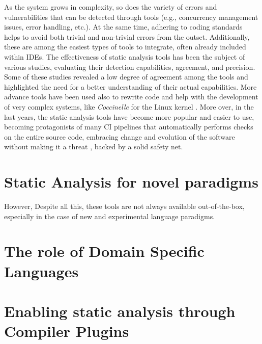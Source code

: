 \documentclass[12pt,a4paper,openright,twoside]{book}
\begin{document}
As the system grows in complexity, so does the variety of errors and
vulnerabilities that can be detected through tools (e.g., concurrency management
issues, error handling, etc.). At the same time, adhering to coding standards
helps to avoid both trivial and non-trivial errors from the outset.
Additionally, these are among the easiest types of tools to integrate, often
already included within \acp{IDE}.
%
The effectiveness of static analysis tools has been the subject of various
studies,  \cite{DBLP:journals/jss/LenarduzziPSLP23} evaluating their detection
capabilities, agreement, and precision. Some of these studies revealed a low
degree of agreement among the tools and highlighted the need for a better
understanding of their actual capabilities. More advance tools have been used
also to rewrite code and help with the development of very complex systems,
like \emph{Coccinelle} for the Linux kernel
\cite{DBLP:conf/eurosys/PadioleauLHM08}\cite{DBLP:conf/usenix/LawallM18}.
%
More over, in the last years, the static analysis tools have become more popular
and easier to use, becoming protagonists of many \ac{CI} pipelines
\cite{DBLP:conf/msr/ZampettiSOCP17} that automatically performs checks on the
entire source code, embracing change and evolution of the software without
making it a threat \cite{DBLP:books/daglib/0015650}, backed by a solid safety
net. 

\section{Static Analysis for novel paradigms}
However, 
Despite all this, these tools are not always available out-of-the-box, especially in the case of new and experimental language paradigms.


\section{The role of Domain Specific Languages}


\section{Enabling static analysis through Compiler Plugins}
\end{document}
